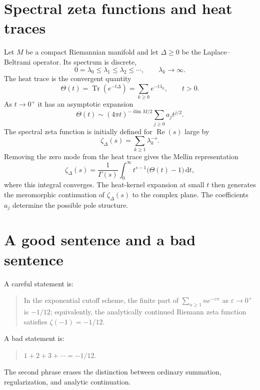 \documentclass[11pt]{article}
\newcommand{\dd}{\,\mathrm{d}}
\newcommand{\Ree}{\operatorname{Re}}
\newcommand{\Tr}{\operatorname{Tr}}
\begin{document}
\section{Spectral zeta functions and heat traces}
Let $M$ be a compact Riemannian manifold and let $\Delta\ge0$ be the Laplace--Beltrami operator. Its spectrum is discrete,
\begin{equation}
  0=\lambda_0\le\lambda_1\le\lambda_2\le\cdots,
  \qquad \lambda_k\to\infty.
\end{equation}
The heat trace is the convergent quantity
\begin{equation}
  \Theta(t)=\Tr(e^{-t\Delta})=\sum_{k\ge0}e^{-t\lambda_k},
  \qquad t>0.
\end{equation}
As $t\to0^+$ it has an asymptotic expansion
\begin{equation}
  \Theta(t)\sim (4\pi t)^{-\dim M/2}\sum_{j\ge0}a_j t^{j/2}.
\end{equation}
The spectral zeta function is initially defined for $\Ree(s)$ large by
\begin{equation}
  \zeta_{\Delta}(s)=\sum_{k\ge1}\lambda_k^{-s}.
\end{equation}
Removing the zero mode from the heat trace gives the Mellin representation
\begin{equation}
  \zeta_{\Delta}(s)=\frac{1}{\Gamma(s)}\int_0^{\infty}t^{s-1}\bigl(\Theta(t)-1\bigr)\dd t,
\end{equation}
where this integral converges. The heat-kernel expansion at small $t$ then generates the meromorphic continuation of $\zeta_{\Delta}(s)$ to the complex plane. The coefficients $a_j$ determine the possible pole structure.

\section{A good sentence and a bad sentence}
A careful statement is:
\begin{quote}
In the exponential cutoff scheme, the finite part of $\sum_{n\ge1}n e^{-\varepsilon n}$ as $\varepsilon\to0^+$ is $-1/12$; equivalently, the analytically continued Riemann zeta function satisfies $\zeta(-1)=-1/12$.
\end{quote}
A bad statement is:
\begin{quote}
$1+2+3+\cdots=-1/12$.
\end{quote}
The second phrase erases the distinction between ordinary summation, regularization, and analytic continuation.
\end{document}
